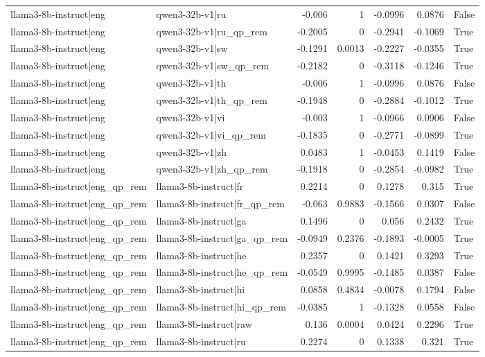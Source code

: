 \begin{table}
\begin{tabular}{l l r r r r l}
llama3-8b-instruct|eng & qwen3-32b-v1|ru & -0.006 & 1 & -0.0996 & 0.0876 & False \\
llama3-8b-instruct|eng & qwen3-32b-v1|ru_qp_rem & -0.2005 & 0 & -0.2941 & -0.1069 & True \\
llama3-8b-instruct|eng & qwen3-32b-v1|sw & -0.1291 & 0.0013 & -0.2227 & -0.0355 & True \\
llama3-8b-instruct|eng & qwen3-32b-v1|sw_qp_rem & -0.2182 & 0 & -0.3118 & -0.1246 & True \\
llama3-8b-instruct|eng & qwen3-32b-v1|th & -0.006 & 1 & -0.0996 & 0.0876 & False \\
llama3-8b-instruct|eng & qwen3-32b-v1|th_qp_rem & -0.1948 & 0 & -0.2884 & -0.1012 & True \\
llama3-8b-instruct|eng & qwen3-32b-v1|vi & -0.003 & 1 & -0.0966 & 0.0906 & False \\
llama3-8b-instruct|eng & qwen3-32b-v1|vi_qp_rem & -0.1835 & 0 & -0.2771 & -0.0899 & True \\
llama3-8b-instruct|eng & qwen3-32b-v1|zh & 0.0483 & 1 & -0.0453 & 0.1419 & False \\
llama3-8b-instruct|eng & qwen3-32b-v1|zh_qp_rem & -0.1918 & 0 & -0.2854 & -0.0982 & True \\
llama3-8b-instruct|eng_qp_rem & llama3-8b-instruct|fr & 0.2214 & 0 & 0.1278 & 0.315 & True \\
llama3-8b-instruct|eng_qp_rem & llama3-8b-instruct|fr_qp_rem & -0.063 & 0.9883 & -0.1566 & 0.0307 & False \\
llama3-8b-instruct|eng_qp_rem & llama3-8b-instruct|ga & 0.1496 & 0 & 0.056 & 0.2432 & True \\
llama3-8b-instruct|eng_qp_rem & llama3-8b-instruct|ga_qp_rem & -0.0949 & 0.2376 & -0.1893 & -0.0005 & True \\
llama3-8b-instruct|eng_qp_rem & llama3-8b-instruct|he & 0.2357 & 0 & 0.1421 & 0.3293 & True \\
llama3-8b-instruct|eng_qp_rem & llama3-8b-instruct|he_qp_rem & -0.0549 & 0.9995 & -0.1485 & 0.0387 & False \\
llama3-8b-instruct|eng_qp_rem & llama3-8b-instruct|hi & 0.0858 & 0.4834 & -0.0078 & 0.1794 & False \\
llama3-8b-instruct|eng_qp_rem & llama3-8b-instruct|hi_qp_rem & -0.0385 & 1 & -0.1328 & 0.0558 & False \\
llama3-8b-instruct|eng_qp_rem & llama3-8b-instruct|raw & 0.136 & 0.0004 & 0.0424 & 0.2296 & True \\
llama3-8b-instruct|eng_qp_rem & llama3-8b-instruct|ru & 0.2274 & 0 & 0.1338 & 0.321 & True \\

\end{tabular}
\end{table}
